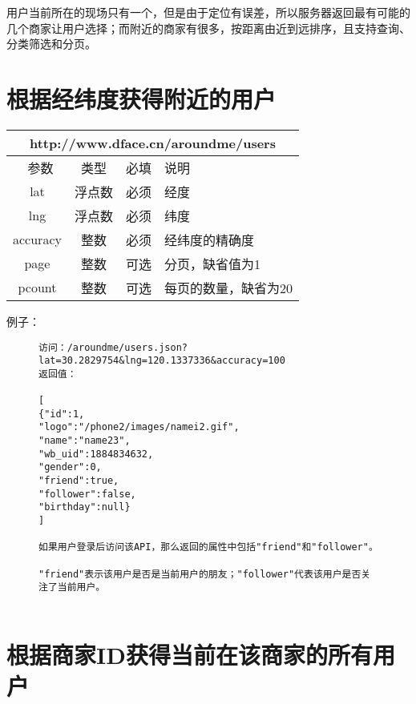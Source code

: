 \documentclass[cs4size]{ctexartutf8}
\begin{document}
用户当前所在的现场只有一个，但是由于定位有误差，所以服务器返回最有可能的几个商家让用户选择；而附近的商家有很多，按距离由近到远排序，且支持查询、分类筛选和分页。



\section{根据经纬度获得附近的用户}

\begin{table}[H]
   \begin{center}
\begin{tabular}{|c|c|c|p{12cm}|}
\hline
\multicolumn{4}{|c|}{http://www.dface.cn/aroundme/users} \\
\hline\hline
 \  参数  & 类型 & 必填 &  说明  \\
\hline
 lat  & 浮点数 & 必须 & 经度\\
\hline
 lng  &  浮点数 & 必须 & 纬度\\ 
\hline
 accuracy  & 整数 & 必须 & 经纬度的精确度\\ 
  \hline
 page  & 整数 & 可选 & 分页，缺省值为1\\ 
 \hline
 pcount  & 整数 & 可选 & 每页的数量，缺省为20\\ 
\hline
\end{tabular}
   \end{center}
\end{table}


例子：

\begin{figure}[H]
\begin{verbatim}
访问：/aroundme/users.json?lat=30.2829754&lng=120.1337336&accuracy=100
返回值：

[
{"id":1,
"logo":"/phone2/images/namei2.gif",
"name":"name23",
"wb_uid":1884834632,
"gender":0,
"friend":true,
"follower":false,
"birthday":null}
]

如果用户登录后访问该API，那么返回的属性中包括"friend"和"follower"。

"friend"表示该用户是否是当前用户的朋友；"follower"代表该用户是否关注了当前用户。


\end{verbatim}
\end{figure}



\section{根据商家ID获得当前在该商家的所有用户}
\end{document}
